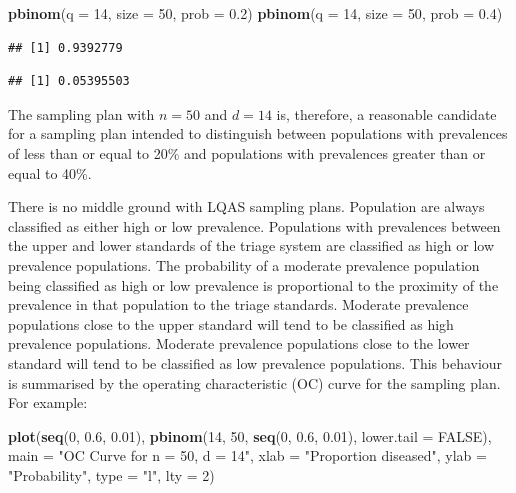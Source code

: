 \documentclass[12pt,a4paper]{book}
\newenvironment{Shaded}{\begin{snugshade}}{\end{snugshade}}
\newcommand{\DataTypeTok}[1]{\textcolor[rgb]{0.13,0.29,0.53}{#1}}
\newcommand{\DecValTok}[1]{\textcolor[rgb]{0.00,0.00,0.81}{#1}}
\newcommand{\FloatTok}[1]{\textcolor[rgb]{0.00,0.00,0.81}{#1}}
\newcommand{\KeywordTok}[1]{\textcolor[rgb]{0.13,0.29,0.53}{\textbf{#1}}}
\newcommand{\NormalTok}[1]{#1}
\newcommand{\OtherTok}[1]{\textcolor[rgb]{0.56,0.35,0.01}{#1}}
\newcommand{\StringTok}[1]{\textcolor[rgb]{0.31,0.60,0.02}{#1}}
\theoremstyle{definition}
\theoremstyle{definition}
\theoremstyle{definition}
\theoremstyle{remark}
\begin{document}
\begin{Shaded}
\begin{Highlighting}[]
\KeywordTok{pbinom}\NormalTok{(}\DataTypeTok{q =} \DecValTok{14}\NormalTok{, }\DataTypeTok{size =} \DecValTok{50}\NormalTok{, }\DataTypeTok{prob =} \FloatTok{0.2}\NormalTok{)}
\KeywordTok{pbinom}\NormalTok{(}\DataTypeTok{q =} \DecValTok{14}\NormalTok{, }\DataTypeTok{size =} \DecValTok{50}\NormalTok{, }\DataTypeTok{prob =} \FloatTok{0.4}\NormalTok{)}
\end{Highlighting}
\end{Shaded}

\begin{verbatim}
## [1] 0.9392779
\end{verbatim}

\begin{verbatim}
## [1] 0.05395503
\end{verbatim}

The sampling plan with \(n = 50\) and \(d = 14\) is, therefore, a
reasonable candidate for a sampling plan intended to distinguish between
populations with prevalences of less than or equal to 20\% and
populations with prevalences greater than or equal to 40\%.

There is no middle ground with LQAS sampling plans. Population are
always classified as either high or low prevalence. Populations with
prevalences between the upper and lower standards of the triage system
are classified as high or low prevalence populations. The probability of
a moderate prevalence population being classified as high or low
prevalence is proportional to the proximity of the prevalence in that
population to the triage standards. Moderate prevalence populations
close to the upper standard will tend to be classified as high
prevalence populations. Moderate prevalence populations close to the
lower standard will tend to be classified as low prevalence populations.
This behaviour is summarised by the operating characteristic (OC) curve
for the sampling plan. For example:

\begin{Shaded}
\begin{Highlighting}[]
\KeywordTok{plot}\NormalTok{(}\KeywordTok{seq}\NormalTok{(}\DecValTok{0}\NormalTok{, }\FloatTok{0.6}\NormalTok{, }\FloatTok{0.01}\NormalTok{),}
     \KeywordTok{pbinom}\NormalTok{(}\DecValTok{14}\NormalTok{, }\DecValTok{50}\NormalTok{, }\KeywordTok{seq}\NormalTok{(}\DecValTok{0}\NormalTok{, }\FloatTok{0.6}\NormalTok{, }\FloatTok{0.01}\NormalTok{), }\DataTypeTok{lower.tail =} \OtherTok{FALSE}\NormalTok{),}
     \DataTypeTok{main =} \StringTok{"OC Curve for n = 50, d = 14"}\NormalTok{,}
     \DataTypeTok{xlab =} \StringTok{"Proportion diseased"}\NormalTok{,}
     \DataTypeTok{ylab =} \StringTok{"Probability"}\NormalTok{,}
     \DataTypeTok{type =} \StringTok{"l"}\NormalTok{, }\DataTypeTok{lty =} \DecValTok{2}\NormalTok{)}
\end{Highlighting}
\end{Shaded}
\end{document}
